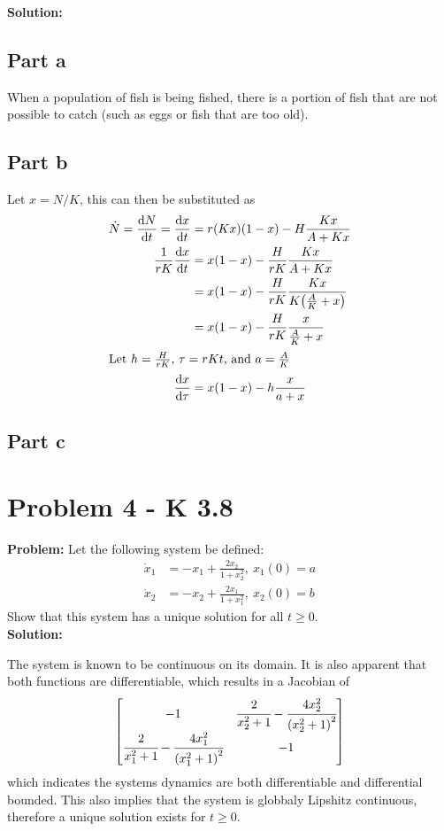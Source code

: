 \documentclass[letter]{article}
\begin{document}
\noindent
\textbf{Solution:}
\subsection{Part a}
When a population of fish is being fished, there is a portion of fish that are not possible to catch (such as eggs or fish that are too old).

\subsection{Part b}
Let $x = N / K$, this can then be substituted as
\begin{align}
	\dot{N} = \dv{N}{t} = \dv{x}{t}	
	&= r (K x) \qty(1 - x) - H\frac{K x}{A + K x}\\
	\frac{1}{r K} \dv{x}{t}
	&= x \qty(1 - x) - \frac{H}{r K}\frac{K x}{A + K x}\\
	&= x \qty(1 - x) - \frac{H}{r K}\frac{K x}{K\qty(\frac{A}{K} + x)}\\
	&= x \qty(1 - x) - \frac{H}{r K}\frac{x}{\frac{A}{K} + x}\\
	\intertext{Let $h = \frac{H}{r K}$, $\tau = r K t$, and $a = \frac{A}{K}$}
	\dv{x}{\tau} &= x (1 - x) - h \frac{x}{a + x}
\end{align}

\subsection{Part c}










\newpage
\section{Problem 4 - K 3.8}
\textbf{Problem:}
Let the following system be defined:
\begin{equation}
	\begin{aligned}
		\dot{x}_1 &= -x_1 + \frac{2 x_2}{1 + x_2^2}, \ x_1(0) = a\\
		\dot{x}_2 &= -x_2 + \frac{2 x_1}{1 + x_1^2}, \ x_2(0) = b
	\end{aligned}
\end{equation}
Show that this system has a unique solution for all $t \geq 0$.\\

\noindent
\textbf{Solution:}

The system is known to be continuous on its domain. It is also apparent that both functions are differentiable, which results in a Jacobian of
\begin{equation}
	\mqty[-1		& \cfrac{2}{x_2^2 + 1} - \cfrac{4 x_2^2}{\qty(x_2^2 + 1)^2}\\
		  \cfrac{2}{x_1^2 + 1} - \cfrac{4 x_1^2}{\qty(x_1^2 + 1)^2} & -1]
\end{equation}
which indicates the systems dynamics are both differentiable and differential bounded. This also implies that the system is globbaly Lipshitz continuous, therefore a unique solution exists for $t\geq 0$.
\end{document}
